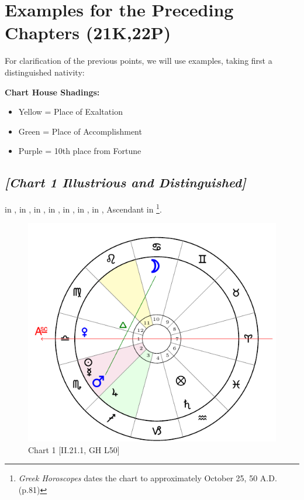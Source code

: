\section{Examples for the Preceding Chapters (21K,22P)}
For clarification of the previous points, we will use examples, taking first a distinguished nativity:

\begin{mdframed}[backgroundcolor=cyan!5]
\textbf{Chart House Shadings:}
\vspace{-1em}
\begin{itemize}
 \setlength\itemsep{-0.5em}
\item Yellow = Place of Exaltation
\item Green = Place of Accomplishment
\item Purple = 10th place from Fortune
\end{itemize}
\vspace{-1em}
\end{mdframed}

\subsection*{\textit{[Chart 1 Illustrious and Distinguished]}}

\Sun\xspace in \Scorpio, \Moon\xspace in \Cancer, \Saturn\xspace in \Aquarius, \Jupiter\xspace in \Sagittarius, \Mars\xspace in \Scorpio, \Venus\xspace in \Libra, \Mercury\xspace in \Scorpio, Ascendant in \Libra
\footnote{\textit{Greek Horoscopes} dates the chart to approximately October 25, 50 A.D. (p.81)}. 

\clearpage
\begin{figure}
\centering
\vspace{-20pt}
\includegraphics[width=.68\textwidth]{charts/2_21_1}
\caption{Chart 1 [II.21.1, GH L50]}
\label{fig:chart01}
\end{figure}

